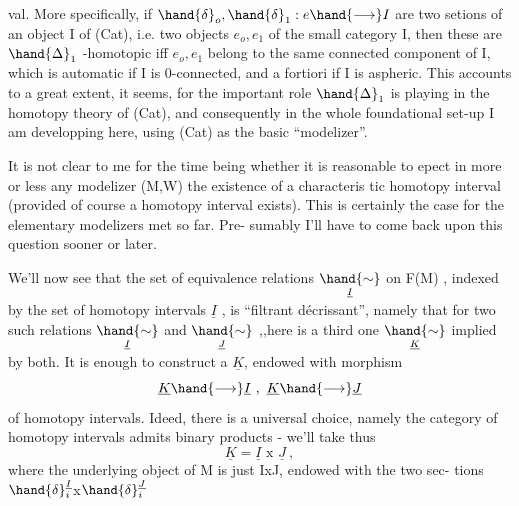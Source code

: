 val. More specifically, if $\hand{\delta}_o,\hand{\delta}_1 : e \hand{\longrightarrow} I$ are two setions of an
object I of (Cat), i.e. two objects $e_o,e_1$ of the small category I, then
these are $\hand{\Delta}_1$ -homotopic iff $e_o,e_1$ belong to the same connected component
of I, which is automatic if I is 0-connected, and a fortiori if I is
aspheric. This accounts to a great extent, it seems, for the important
role $\hand{\Delta}_1$ is playing in the homotopy theory of (Cat), and consequently in
the whole foundational set-up I am developping here, using (Cat) as the
basic ``modelizer''.

It is not clear to me for the time being whether it is reasonable to
epect in more or less any modelizer (M,W) the existence of a characteris%
tic homotopy interval (provided of course a homotopy interval exists).
This is certainly the case for the elementary modelizers met so far. Pre-%
sumably I'll have to come back upon this question sooner or later.

We'll now see that the set of equivalence relations $\underset{\underline{I}}{\hand{\sim}}$ on F(M) ,
indexed by the set of homotopy intervals $\underline{I}$ , is ``filtrant d\'ecrissant'',
namely that for two such relations $\underset{\underline{I}}{\hand{\sim}}$ and $\underset{\underline{J}}{\hand{\sim}}$ ,,here is a third  one\hand{,}
$\underset{\underline{K}}{\hand{\sim}}$ implied by both. It is enough to construct a $\underline{K}$, endowed with morphism
\[ \underline{K} \hand{\longrightarrow} \underline{I} \ , \ \underline{K} \hand{\longrightarrow} \underline{J} \]
of homotopy intervals. Ideed, there is a universal choice, namely the
category of homotopy intervals admits binary products - we'll take thus
\[ \underline{K} = \underline{I} \text{ x } \underline{J} \ , \]
where the underlying object of M is just IxJ, endowed with the two sec-%
tions $\hand{\delta}^{\underline{I}}_{i}$x$\hand{\delta}^{\underline{J}}_{i}$ 

